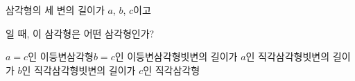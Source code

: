 삼각형의 세 변의 길이가 $a$, $b$, $c$이고\par\smallskip{}\par\smallskip\noindent 일 때, 이 삼각형은 어떤 삼각형인가?
\begin{choicesv}{$a=c$인 이등변삼각형}{$b=c$인 이등변삼각형}{빗변의 길이가 $a$인 직각삼각형}{빗변의 길이가 $b$인 직각삼각형}{빗변의 길이가 $c$인 직각삼각형}\end{choicesv}
